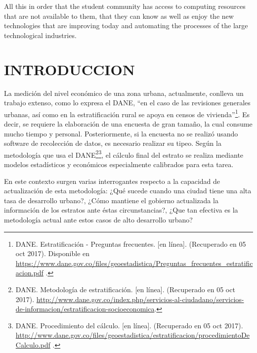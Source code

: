     All this in order that the student community has access to computing resources that are not available to them, that they can know as well as enjoy the new technologies that are improving today and automating the processes of the large technological industries.
    
	\newpage\chapter*{INTRODUCCION}
    La medición del nivel económico de una zona urbana, actualmente, conlleva un trabajo extenso, como lo expresa el DANE, “en el caso de las revisiones generales urbanas, así como en la estratificación rural se apoya en censos de vivienda”\footnote{DANE. Estratificación - Preguntas frecuentes. [en línea]. (Recuperado en 05 oct 2017). Disponible en \url{https://www.dane.gov.co/files/geoestadistica/Preguntas_frecuentes_estratificacion.pdf} .}. Es decir, se requiere la elaboración de una encuesta de gran tamaño, la cual consume mucho tiempo y personal. Posteriormente, si la encuesta no se realizó usando software de recolección de datos, es necesario realizar su tipeo. Según la metodología que usa el DANE\footnote{DANE. Metodología de estratificación. [en línea]. (Recuperado en 05 oct 2017). \url{http://www.dane.gov.co/index.php/servicios-al-ciudadano/servicios-de-informacion/estratificacion-socioeconomica}.}\footnote{DANE. Procedimiento del cálculo. [en línea]. (Recuperado en 05 oct 2017). \url{http://www.dane.gov.co/files/geoestadistica/estratificacion/procedimientoDeCalculo.pdf} .}, el cálculo final del estrato se realiza mediante modelos estadísticos y económicos especialmente calibrados para esta tarea.
    
    En este contexto surgen varias interrogantes respecto a la capacidad de actualización de esta metodología: ¿Qué sucede cuando una ciudad tiene una alta tasa de desarrollo urbano?, ¿Cómo mantiene el gobierno actualizada la información de los estratos ante éstas circunstancias?, ¿Que tan efectiva es la metodología actual ante estos casos de alto desarrollo urbano?
    
